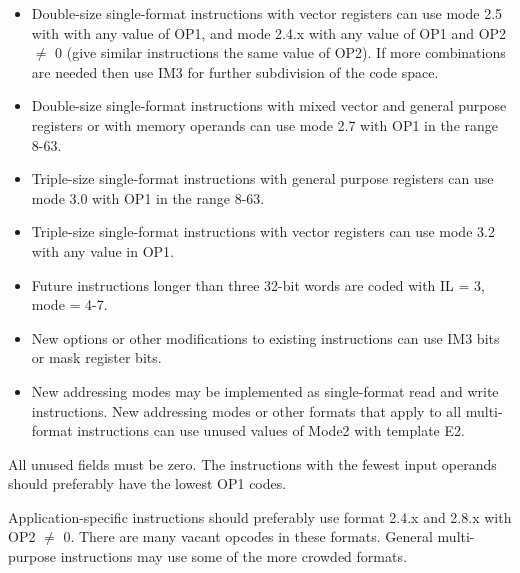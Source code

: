 \documentclass[forwardcom.tex]{subfiles}
\begin{document}
\begin{itemize}
\item Double-size single-format instructions with vector registers can use mode 2.5 with with any value of OP1, and mode 2.4.x with any value of OP1 and OP2 $\neq$ 0 (give similar instructions the same value of OP2). If more combinations are needed then use IM3 for further subdivision of the code space.

\item Double-size single-format instructions with mixed vector and general purpose registers or with memory operands can use mode 2.7 with OP1 in the range 8-63.

\item Triple-size single-format instructions with general purpose registers can use mode 3.0 with OP1 in the range 8-63.

\item Triple-size single-format instructions with vector registers can use mode 3.2 with any value in OP1.

\item Future instructions longer than three 32-bit words are coded with IL = 3, mode = 4-7.

\item New options or other modifications to existing instructions can use IM3 bits or mask register bits.

\item New addressing modes may be implemented as single-format read and write instructions. New addressing modes or other formats that apply to all multi-format instructions can use unused values of Mode2 with template E2.


\end{itemize}

All unused fields must be zero. The instructions with the fewest input operands should preferably have the lowest OP1 codes. 
\vspace{2mm}

Application-specific instructions should preferably use format 2.4.x and 2.8.x with OP2 $\neq$ 0. There are many vacant opcodes in these formats. General multi-purpose instructions may use some of the more crowded formats.
\end{document}
